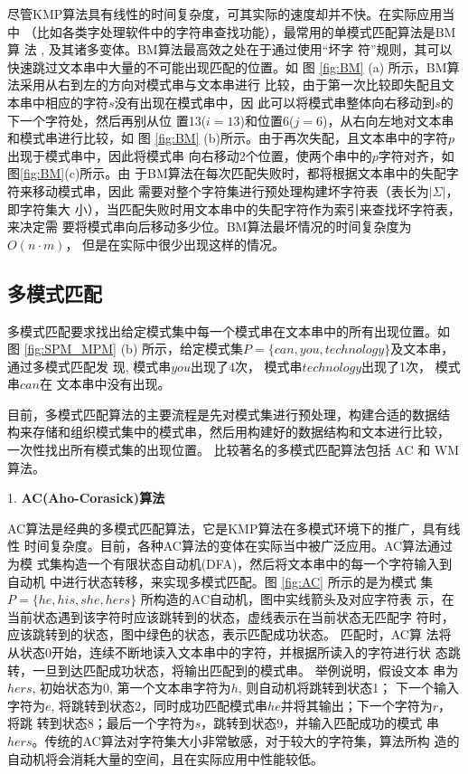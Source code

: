 尽管KMP算法具有线性的时间复杂度，可其实际的速度却并不快。在实际应用当中
（比如各类字处理软件中的字符串查找功能），最常用的单模式匹配算法是BM算
法 \cite{Boyer1977}, 及其诸多变体。BM算法最高效之处在于通过使用“坏字
符”规则，其可以快速跳过文本串中大量的不可能出现匹配的位置。如
图 \ref{fig:BM} (a) 所示，BM算法采用从右到左的方向对模式串与文本串进行
比较，由于第一次比较即失配且文本串中相应的字符$s$没有出现在模式串中，因
此可以将模式串整体向右移动到$s$的下一个字符处，然后再别从位
置13($i=13$)和位置6($j=6$)，从右向左地对文本串和模式串进行比较，如
图 \ref{fig:BM}
(b)所示。由于再次失配，且文本串中的字符$p$出现于模式串中，因此将模式串
向右移动2个位置，使两个串中的$p$字符对齐，如图\ref{fig:BM}(c)所示。由
于BM算法在每次匹配失败时，都将根据文本串中的失配字符来移动模式串，因此
需要对整个字符集进行预处理构建坏字符表（表长为$|\Sigma|$，即字符集大
小），当匹配失败时用文本串中的失配字符作为索引来查找坏字符表，来决定需
要将模式串向后移动多少位。BM算法最坏情况的时间复杂度为$O(n \cdot m)$，
但是在实际中很少出现这样的情况。

\subsection{多模式匹配}

多模式匹配要求找出给定模式集中每一个模式串在文本串中的所有出现位置。如
图 \ref{fig:SPM_MPM} (b)
所示，给定模式集$P=\{can, you, technology\}$及文本串，通过多模式匹配发
现, 模式串$you$出现了4次， 模式串$technology$出现了1次， 模式串$can$在
文本串中没有出现。

目前，多模式匹配算法的主要流程是先对模式集进行预处理，构建合适的数据结
构来存储和组织模式集中的模式串，然后用构建好的数据结构和文本进行比较，
一次性找出所有模式集的出现位置。 比较著名的多模式匹配算法包括 AC
\cite{Aho1975} 和 WM \cite{Wu1994} 算法。

1. \textbf{AC(Aho-Corasick)算法}

AC算法是经典的多模式匹配算法，它是KMP算法在多模式环境下的推广，具有线性
时间复杂度。目前，各种AC算法的变体在实际当中被广泛应用。AC算法通过为模
式集构造一个有限状态自动机(DFA)，然后将文本串中的每一个字符输入到自动机
中进行状态转移，来实现多模式匹配。图 \ref{fig:AC} 所示的是为模式
集$P=\{he, his, she, hers\}$ 所构造的AC自动机，图中实线箭头及对应字符表
示，在当前状态遇到该字符时应该跳转到的状态，虚线表示在当前状态无匹配字
符时，应该跳转到的状态，图中绿色的状态，表示匹配成功状态。 匹配时，AC算
法将从状态0开始，连续不断地读入文本串中的字符，并根据所读入的字符进行状
态跳转，一旦到达匹配成功状态，将输出匹配到的模式串。 举例说明，假设文本
串为$hers$, 初始状态为0, 第一个文本串字符为$h$, 则自动机将跳转到状态1；
下一个输入字符为$e$,
将跳转到状态2，同时成功匹配模式串$he$并将其输出；下一个字符为$r$，将跳
转到状态8；最后一个字符为$s$，跳转到状态9，并输入匹配成功的模式
串$hers$。传统的AC算法对字符集大小非常敏感，对于较大的字符集，算法所构
造的自动机将会消耗大量的空间，且在实际应用中性能较低。


